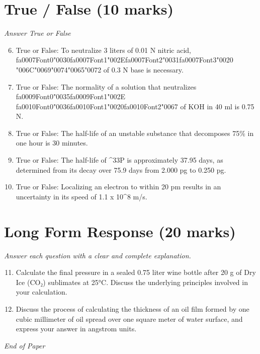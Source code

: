 \documentclass[12pt]{article}
\begin{document}
\section*{True / False (10 marks)}
\textit{Answer True or False}
\begin{enumerate}[label=\arabic*.]
\setcounter{enumi}{5}
\item True or False: To neutralize 3 liters of 0.01 N nitric acid, {\csname fa0007Font0\endcsname\char"0030}{\csname fa0007Font1\endcsname\char"002E}{\csname fa0007Font2\endcsname\char"0031}{\csname fa0007Font3\endcsname\char"0020} {\char"006C}{\char"0069}{\char"0074}{\char"0065}{\char"0072} of 0.3 N base is necessary.
\item True or False: The normality of a solution that neutralizes {\csname fa0009Font0\endcsname\char"0035}{\csname fa0009Font1\endcsname\char"002E} {\csname fa0010Font0\endcsname\char"0036}{\csname fa0010Font1\endcsname\char"0020}{\csname fa0010Font2\endcsname\char"0067} of KOH in 40 ml is 0.75 N.
\item True or False: The half-life of an unstable substance that decomposes 75\% in one hour is 30 minutes.
\item True or False: The half-life of \^{}33P is approximately 37.95 days, as determined from its decay over 75.9 days from 2.000 pg to 0.250 pg.
\item True or False: Localizing an electron to within 20 pm results in an uncertainty in its speed of 1.1 x 10\^{}8 m/s.
\end{enumerate}

\section*{Long Form Response (20 marks)}
\textit{Answer each question with a clear and complete explanation.}
\begin{enumerate}[label=\arabic*.]
\setcounter{enumi}{10}
\item Calculate the final pressure in a sealed 0.75 liter wine bottle after 20 g of Dry Ice
(CO₂) sublimates at 25°C. Discuss the underlying principles involved in your calculation.
\item Discuss the process of calculating the thickness of an oil film formed by one cubic
millimeter of oil spread over one square meter of water surface, and express your answer
in angstrom units.
\end{enumerate}

\vfill
\noindent\textit{End of Paper}
\end{document}

